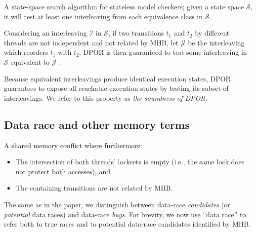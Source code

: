 \begin{definition}
	A state-space search algorithm for stateless model checkers;
	given a state space $\mathcal{S}$, it will test at least one interleaving from each equivalence class in $\mathcal{S}$.
	\label{def:dpor}
\end{definition}

Considering an interleaving $\mathcal{I}$ in $\mathcal{S}$, if two transitions $t_1$ and $t_2$ by different threads are not independent and not related by MHB, let $\mathcal{J}$ be the interleaving which reorders $t_1$ with $t_2$. DPOR is then guaranteed to test some interleaving in $\mathcal{S}$ equivalent to $\mathcal{J}$ \cite{dpor}.

Because equivalent interleavings produce identical execution states,
DPOR guarantees to expose all reachable execution states by testing its subset of interleavings.
We refer to this property as {\em the soundness of DPOR}.


\subsection{Data race and other memory terms}

\begin{definition}
A shared memory conflict where furthermore:
\begin{itemize}
	\item The intersection of both threads' locksets is empty (i.e., the same lock does not protect both accesses), and
	\item The containing transitions are not related by MHB.
\end{itemize}
\end{definition}

The same as in the paper, we distinguish between data-race {\em candidates} (or {\em potential} data races) and data-race {\em bugs}.
For brevity, we now use ``data race'' to refer both to true races and to potential data-race candidates identified by MHB.

